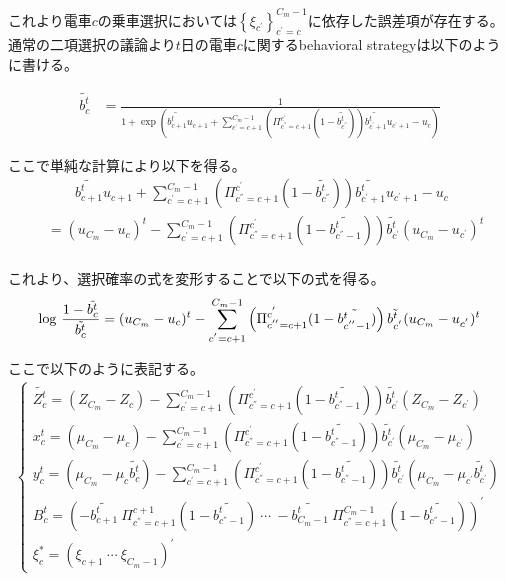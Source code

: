 \documentclass{jsarticle}
\begin{document}
これより電車$c$の乗車選択においては$\left\{ \xi_{c^{'}} \right\}_{c^{'} = c}^{C_m-1}$に依存した誤差項が存在する。通常の二項選択の議論より$t$日の電車$c$に関するbehavioral strategyは以下のように書ける。

\begin{align*}
	\tilde{b_c^t} &= \frac{1}{1 + \exp \left(\tilde{b_{c+1}^t} u_{c+1} + \sum_{c^{'}=c+1}^{C_m-1} \left( \Pi_{c^{''} = c+1}^{c^{'}} (1 - \tilde{b_{c^{''}}^t}) \right) \tilde{b_{c^{'} + 1}^t} u_{c^{'} + 1} - u_c \right)}
\end{align*}

ここで単純な計算により以下を得る。
\begin{align*}
	&\qquad \tilde{b_{c+1}^t} u_{c+1} + \sum_{c^{'}=c+1}^{C_m-1} \left( \Pi_{c^{''} = c+1}^{c^{'}} (1 - \tilde{b_{c^{''}}^t}) \right) \tilde{b_{c^{'} + 1}^t} u_{c^{'} + 1} - u_c\\[8pt]
	&= (u_{C_m} - u_c)^t - \sum_{c^{'} = c+1}^{C_m - 1} \left( \Pi_{c^{''} = c+1}^{c^{'}} (1 - \tilde{b_{c^{''} - 1}^t}) \right) \tilde{b_{c^{'}}^t} (u_{C_m} - u_{c^{'}})^t\\[8pt]
\end{align*}

これより、選択確率の式を変形することで以下の式を得る。
\begin{align}
	{\rm log}\ \frac{1 - \tilde{{b_c^t}}}{\tilde{b_c^t}} = (u_{C_m} - u_c)^t - \sum_{c^{'} = c+1}^{C_m - 1} \left( \Pi_{c^{''} = c+1}^{c^{'}} (1 - \tilde{b_{c^{''} - 1}^t}) \right) \tilde{b_{c^{'}}^t} (u_{C_m} - u_{c^{'}})^t
\end{align}

ここで以下のように表記する。
\begin{align*}
	\begin{cases}
		\tilde{Z_c^t} = (Z_{C_m} - Z_c) - \sum_{c^{'} = c+1}^{C_m - 1} \left( \Pi_{c^{''} = c+1}^{c^{'}} (1 - \tilde{b_{c^{''} - 1}^t}) \right) \tilde{b_{c^{'}}^t} (Z_{C_m} - Z_{c^{'}})\\[8pt]
		x_c^t = (\mu_{C_m} - \mu_c) - \sum_{c^{'} = c+1}^{C_m - 1} \left( \Pi_{c^{''} = c+1}^{c^{'}} (1 - \tilde{b_{c^{''} - 1}^t}) \right) \tilde{b_{c^{'}}^t} (\mu_{C_m} - \mu_{c^{'}})\\[8pt]
		y_c^t = (\mu_{C_m} - \mu_c \tilde{b_c^t}) - \sum_{c^{'} = c+1}^{C_m - 1} \left( \Pi_{c^{''} = c+1}^{c^{'}} (1 - \tilde{b_{c^{''} - 1}^t}) \right) \tilde{b_{c^{'}}^t} (\mu_{C_m} - \mu_{c^{'}} \tilde{b_{c^{'}}^t})\\[8pt]
		B_c^t = \left( -\tilde{b_{c+1}^t}\ \Pi_{c^{''} = c+1}^{c+1}(1 - \tilde{b_{c^{''} -1}^t})\ \cdots\ -\tilde{b_{C_m-1}^t}\ \Pi_{c^{''} = c+1}^{C_m-1}(1 - \tilde{b_{c^{''} -1}^t})\right)^{'}\\[8pt]
		\xi_c^{*} = \left( \xi_{c+1}\ \cdots\ \xi_{C_m-1} \right)^{'}
	\end{cases}
\end{align*}
\end{document}
